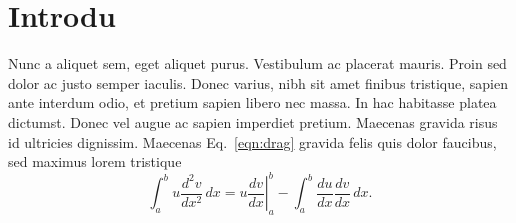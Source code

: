 \section{Introdu}
\label{intro} 
Nunc a aliquet sem, eget aliquet purus. Vestibulum ac placerat mauris. Proin sed dolor ac justo semper iaculis. Donec varius, nibh sit amet finibus tristique, sapien ante interdum odio, et pretium sapien libero nec massa. In hac habitasse platea dictumst. Donec vel augue ac sapien imperdiet pretium. Maecenas gravida risus id ultricies dignissim. Maecenas Eq.~\ref{eqn:drag} gravida felis quis dolor faucibus, sed maximus lorem tristique
\begin{equation}
\label{eqn:drag}
	\int_a^bu\frac{d^2v}{dx^2}\,dx
	=\left.u\frac{dv}{dx}\right|_a^b
	-\int_a^b\frac{du}{dx}\frac{dv}{dx}\,dx.
\end{equation}
